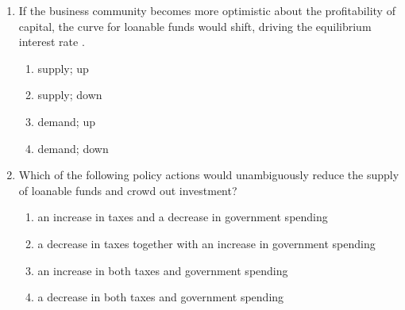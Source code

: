 \documentclass{article}
\begin{document}
\begin{enumerate}
\begin{enumerate}
	\end{enumerate}
	
\item If the business community becomes more optimistic about the profitability of capital, the \underline{\phantom{xxxxxxxxxx}} curve for loanable funds would shift, driving the equilibrium interest rate \underline{\phantom{xxxxxxxxxx}}.

	\begin{enumerate}
	
	\item supply; up
	
	\item supply; down
	
	\item demand; up
	
	\item demand; down
	
	\end{enumerate}
	
\item Which of the following policy actions would unambiguously reduce the supply of loanable funds and crowd out investment?

	\begin{enumerate}
	
	\item an increase in taxes and a decrease in government spending
	
	\item a decrease in taxes together with an increase in government spending
	
	\item an increase in both taxes and government spending
	
	\item a decrease in both taxes and government spending
	
	\end{enumerate}

\end{enumerate}
\end{document}
